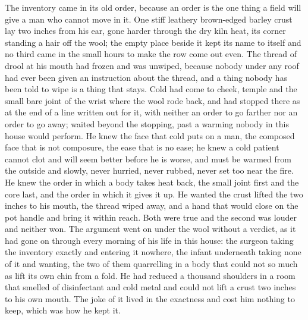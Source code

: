 The inventory came in its old order, because an order is the one thing a field will give a man who cannot move in it. One stiff leathery brown-edged barley crust lay two inches from his ear, gone harder through the dry kiln heat, its corner standing a hair off the wool; the empty place beside it kept its name to itself and no third came in the small hours to make the row come out even. The thread of drool at his mouth had frozen and was unwiped, because nobody under any roof had ever been given an instruction about the thread, and a thing nobody has been told to wipe is a thing that stays. Cold had come to cheek, temple and the small bare joint of the wrist where the wool rode back, and had stopped there as at the end of a line written out for it, with neither an order to go farther nor an order to go away;  waited beyond the stopping, past a warming nobody in this house would perform. He knew the face that cold puts on a man, the composed face that is not composure, the ease that is no ease; he knew a cold patient cannot clot and will seem better before he is worse, and must be warmed from the outside and slowly, never hurried, never rubbed, never set too near the fire. He knew the order in which a body takes heat back, the small joint first and the core last, and the order in which it gives it up. He wanted the crust lifted the two inches to his mouth, the thread wiped away, and a hand that would close on the pot handle and bring it within reach. Both were true and the second was louder and neither won. The argument went on under the wool without a verdict, as it had gone on through every morning of his life in this house: the surgeon taking the inventory exactly and entering it nowhere, the infant underneath taking none of it and wanting, the two of them quarrelling in a body that could not so much as lift its own chin from a fold. He had reduced a thousand shoulders in a room that smelled of disinfectant and cold metal and could not lift a crust two inches to his own mouth. The joke of it lived in the exactness and cost him nothing to keep, which was how he kept it.

